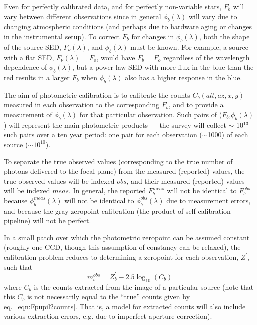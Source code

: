 \documentclass[12pt,preprint]{aastex}
\begin{document}
Even for perfectly calibrated data, and for perfectly non-variable 
stars, $F_b$ will vary between different observations since in general 
$\phi_b(\lambda)$ will vary due to changing atmospheric conditions  
(and perhaps due to hardware aging or changes in the instrumental setup). 
To correct $F_b$ for changes in $\phi_b(\lambda)$, both the shape of the source
SED, $F_\nu(\lambda)$, and $\phi_b(\lambda)$ must be known. 
For example, a source with a flat SED, $F_\nu(\lambda)=F_o$, would 
have $F_b = F_o$ regardless of the wavelength dependence of $\phi_b(\lambda)$, 
but a power-law SED with more flux in the blue than the red results in a larger
$F_b$ when $\phi_b(\lambda)$ also has a higher response in the blue.

The aim of photometric calibration is to calibrate the counts $C_b(alt,az,x,y)$ measured in each observation 
to the corresponding $F_b$, and to provide a measurement of $\phi_b(\lambda)$ for that particular observation. 
Such pairs of ($F_b$,$\phi_b(\lambda)$) will represent the main photometric products --- the 
survey will collect $\sim$ 10$^{13}$ such pairs over a ten year period: one pair for each observation 
($\sim$1000) of each source ($\sim10^{10}$). 

To separate the true observed values (corresponding to the true number of photons delivered to the 
focal plane) from the measured (reported) values, the true observed values will be indexed $obs$, and 
their measured (reported) values will be indexed $meas$. In general,  the reported $F_b^{meas}$ will
not be identical to $F_b^{obs}$ because $\phi_b^{meas}(\lambda)$ will not be identical
to $\phi_b^{obs}(\lambda)$ due to measurement errors, and because the gray zeropoint calibration 
(the product of self-calibration pipeline) will not be perfect. 


In a small patch over which the photometric zeropoint can be assumed
constant (roughly one CCD, though this assumption of constancy can
be relaxed), the calibration problem reduces to 
determining a zeropoint for each observation, $Z^{'}$, such that 
\begin{equation}
\label{eqn:mobs}
                    m_b^{obs} = Z^{'}_b -2.5\log_{10}(C_b) 
\end{equation}
where $C_b$ is the counts extracted from the image of a particular source
(note that this $C_b$ is not necessarily equal to the ``true'' counts given by
eq.~\ref{eqn:Fpupil2counts}. That is, a model for extracted counts will also
include various extraction errors, e.g. due to imperfect aperture correction). 
\end{document}
